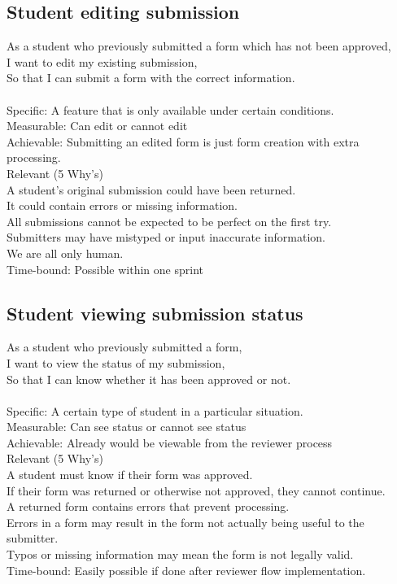 \documentclass[10pt]{book}
\begin{document}
\begin{landscape}
\section*{Student editing submission}
As a student who previously submitted a form which has not been approved,\\
I want to edit my existing submission,\\
So that I can submit a form with the correct information.\\
\\
Specific: A feature that is only available under certain conditions.\\
Measurable: Can edit or cannot edit\\
Achievable: Submitting an edited form is just form creation with extra processing.\\
Relevant (5 Why's)\\
    \indent
    A student's original submission could have been returned.\\
    \indent
    It could contain errors or missing information.\\
    \indent
    All submissions cannot be expected to be perfect on the first try.\\
    \indent
    Submitters may have mistyped or input inaccurate information.\\
    \indent
    We are all only human.\\
Time-bound: Possible within one sprint
\end{landscape}

\begin{landscape}
\section*{Student viewing submission status}
As a student who previously submitted a form,\\
I want to view the status of my submission,\\
So that I can know whether it has been approved or not.\\
\\
Specific: A certain type of student in a particular situation.\\
Measurable: Can see status or cannot see status\\
Achievable: Already would be viewable from the reviewer process\\
Relevant (5 Why's)\\
    \indent
    A student must know if their form was approved.\\
    \indent
    If their form was returned or otherwise not approved, they cannot continue.\\
    \indent
    A returned form contains errors that prevent processing.\\
    \indent
    Errors in a form may result in the form not actually being useful to the submitter.\\
    \indent
    Typos or missing information may mean the form is not legally valid.\\
Time-bound: Easily possible if done after reviewer flow implementation.
\end{landscape}
\end{document}
